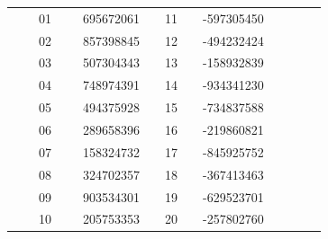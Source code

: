 \documentclass[12pt]{article}
\begin{document}
\begin{table}[h]
\begin{minipage}{\textwidth}
\begin{tabular}{cccccccccccc}
\multicolumn{4}{c}{~~~~01~~~~~695672061} &  \multicolumn{4}{c}{~~11~~~~-597305450} \\
\multicolumn{4}{c}{~~~~02~~~~~857398845} &  \multicolumn{4}{c}{~~12~~~~-494232424} \\
\multicolumn{4}{c}{~~~~03~~~~~507304343} &  \multicolumn{4}{c}{~~13~~~~-158932839} \\
\multicolumn{4}{c}{~~~~04~~~~~748974391} &	\multicolumn{4}{c}{~~14~~~~-934341230} \\
\multicolumn{4}{c}{~~~~05~~~~~494375928} &	\multicolumn{4}{c}{~~15~~~~-734837588} \\
\multicolumn{4}{c}{~~~~06~~~~~289658396} &	\multicolumn{4}{c}{~~16~~~~-219860821} \\
\multicolumn{4}{c}{~~~~07~~~~~158324732} &	\multicolumn{4}{c}{~~17~~~~-845925752} \\
\multicolumn{4}{c}{~~~~08~~~~~324702357} &	\multicolumn{4}{c}{~~18~~~~-367413463} \\
\multicolumn{4}{c}{~~~~09~~~~~903534301} &	\multicolumn{4}{c}{~~19~~~~-629523701} \\
\multicolumn{4}{c}{~~~~10~~~~~205753353} &	\multicolumn{4}{c}{~~20~~~~-257802760} \\

\hline
\end{tabular}
\end{minipage}
\end{table}
\end{document}
